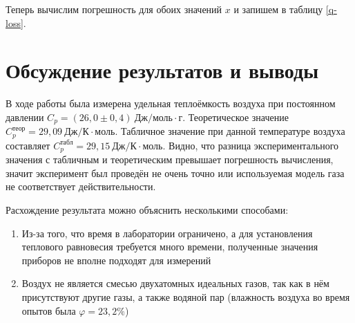 \documentclass[a4paper,12pt]{article}
\begin{document}
Теперь вычислим погрешность для обоих значений $x$ и запишем в таблицу \ref{q-loss}.

\section{Обсуждение результатов и выводы}

В ходе работы была измерена удельная теплоёмкость воздуха при постоянном давлении $C_p = (26,0 \pm 0,4) \ \text{Дж}/\text{моль} \cdot \text{г}$. Теоретическое значение $C_p^\text{теор} = 29,09 \ \text{Дж}/\text{К} \cdot \text{моль}$. Табличное значение при данной температуре воздуха составляет $C_p^\text{табл} = 29,15 \ \text{Дж}/\text{К} \cdot \text{моль}$. Видно, что разница экспериментального значения с табличным и теоретическим превышает погрешность вычисления, значит эксперимент был проведён не очень точно или используемая модель газа не соответствует действительности.

Расхождение результата можно объяснить несколькими способами:

\begin{enumerate}
    \item Из-за того, что время в лаборатории ограничено, а для установления теплового равновесия требуется много времени, полученные значения приборов не вполне подходят для измерений
    \item Воздух не является смесью двухатомных идеальных газов, так как в нём присутствуют другие газы, а также водяной пар (влажность воздуха во время опытов была $\varphi = 23,2 \%$)
\end{enumerate}
\end{document}

